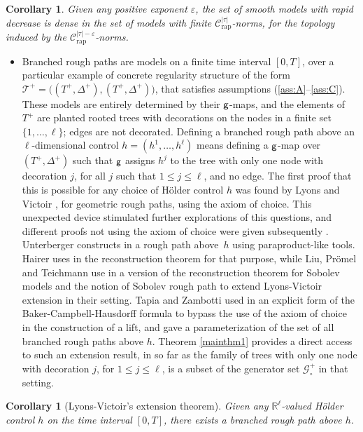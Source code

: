 \documentclass[JEP,XML,SOM,Unicode,published]{cedram}
\theoremstyle{plain}
\newtheorem{cor}[thm]{Corollary}
\theoremstyle{definition}
\newcommand{\rap}{\mathrm{rap}}
\let\epsilon\varepsilon
\newcommand{\bbR}{\mathbb{R}}
\newcommand{\mcC}{\mathcal{C}}
\newcommand{\mcG}{\mathcal{G}}
\begin{document}
\begin{cor} \label{CorDensity}
Given any positive exponent $\epsilon$, the set of smooth models with rapid decrease
is dense in the set of models with finite $\mcC_{\rap}^{|\tau|}$-norms, for the topology induced by the $\mcC_{\rap}^{|\tau|-\epsilon}$-norms.
\end{cor}

\begin{itemize}
\item
Branched rough paths are models on a finite time interval $[0,T]$, over a particular example of concrete regularity structure of the form $\mathscr{T}^+=\bigl((T^+,\Delta^+),(T^+,\Delta^+)\bigr)$, that satisfies assumptions (\ref{ass:A}--\ref{ass:C}). These models are entirely determined by their $\sf g$\nobreakdash-maps, and the elements of $T^+$ are planted rooted trees with decorations on the nodes in a finite set $\{1,\dots,\ell\}$; edges are not decorated. Defining a branched rough path above an $\ell$-dimensional control $h=(h^1,\dots,h^\ell)$ means defining a $\sf g$-map over $(T^+,\Delta^+)$ such that $\sf g$ assigns $h^j$ to the tree with only one node with decoration $j$, for all $j$ such that $1\leq j\leq \ell$, and no edge. The first proof that this is possible for any choice of Hölder control $h$ was found by Lyons and Victoir \cite{LyonsVictoir}, for geometric rough paths, using the axiom of choice. This unexpected device stimulated further explorations of this questions, and different proofs not using the axiom of choice were given subsequently \cite{Unterberger, Hai, TZ18, LPT18}. Unterberger constructs in \cite{Unterberger} a rough path above~$h$ using paraproduct-like tools. Hairer uses in \cite{Hai} the reconstruction theorem for that purpose, while Liu, Prömel and Teichmann use in \cite{LPT18} a version of the reconstruction theorem for Sobolev models and the notion of Sobolev rough path to extend Lyons-Victoir extension in their setting. Tapia and Zambotti used in \cite{TZ18} an explicit form of the Baker-Campbell-Hausdorff formula to bypass the use of the axiom of choice in the construction of a lift, and gave a parameterization of the set of all branched rough paths above $h$. Theorem \ref{mainthm1} provides a direct access to such an extension result, in so far as the family of trees with only one node with decoration $j$, for $1\leq j\leq\ell$, is a subset of the generator set $\mcG^+_\circ$ in that setting.
\end{itemize}

\begin{cor}[Lyons-Victoir's extension theorem] \label{CorLyonsVictoir}
Given any $\bbR^\ell$-valued Hölder control $h$ on the time interval $[0,T]$, there exists a branched rough path above $h$.
\end{cor}
\end{document}
